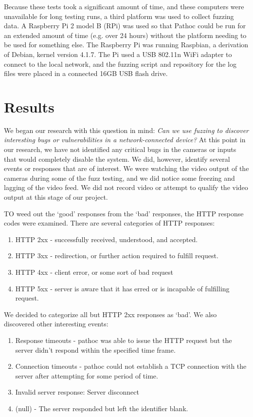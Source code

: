 \documentclass[letterpaper,twocolumn,10pt]{article}
\begin{document}
Because these tests took a significant amount of time, and these computers were unavailable for long testing runs, a third platform was used to collect fuzzing data. A Raspberry Pi 2 model B (RPi) was used so that Pathoc could be run for an extended amount of time (e.g. over 24 hours) without the platform needing to be used for something else. The Raspberry Pi was running Raspbian, a derivation of Debian, kernel version 4.1.7. The Pi used a USB 802.11n WiFi adapter to connect to the local network, and the fuzzing script and repository for the log files were placed in a connected 16GB USB flash drive.


\section{Results}
We began our research with this question in mind: \textit{Can we use fuzzing to discover interesting bugs or vulnerabilities in a network-connected device?} At this point in our research, we have not identified any critical bugs in the cameras or inputs that would completely disable the system. We did, however, identify several events or responses that are of interest. We were watching the video output of the cameras during some of the fuzz testing, and we did notice some freezing and lagging of the video feed. We did not record video or attempt to qualify the video output at this stage of our project. 

TO weed out the `good' responses from the `bad' responses, the HTTP response codes were examined. There are several categories of HTTP responses: 
\begin{enumerate}
\item HTTP 2xx - successfully received, understood, and accepted.
\item HTTP 3xx - redirection, or further action required to fulfill request.
\item HTTP 4xx - client error, or some sort of bad request
\item HTTP 5xx - server is aware that it has erred or is incapable of fulfilling request.
\end{enumerate}
We decided to categorize all but HTTP 2xx responses as `bad'. We also discovered other interesting events:
\begin{enumerate}
	\item Response timeouts - pathoc was able to issue the HTTP request but the server didn't respond within the specified time frame.
	\item Connection timeouts - pathoc could not establish a TCP connection with the server after attempting for some period of time.
	\item Invalid server response: Server disconnect
	\item (null) - The server responded but left the identifier blank.
\end{enumerate}
\end{document}
